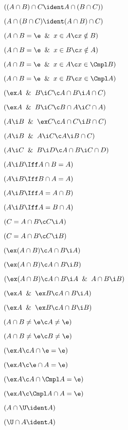  $((A \cap B) \cap C \ident A \cap (B\cap C))$

 $(A\cap (B \cap C) \ident (A \cap B) \cap C)$

 $(A \cap B = \e \And x \in A \c x \notin B)$

 $(A \cap B = \e \And x \in B \c x \notin A)$

 $(A \cap B = \e \And x \in A \c x \in \Cmpl B)$

 $(A \cap B = \e \And x \in B \c x \in \Cmpl A)$

 $(\ex A \And B \i C \c A \cap B\i A\cap  C)$

 $(\ex A \And B \i C \c B \cap A\i C\cap  A)$

 $(A\i B \And \ex C\c A\cap C \i B\cap C)$

 $(A \i B \And A \i C \c A \i B \cap C)$

 $(A \i C \And B \i D \c A \cap B \i C \cap D)$

 $(A\i B \Iff A\cap B = A)$

 $(A\i B \Iff B\cap A = A)$

 $(A\i B \Iff A = A\cap B )$

 $(A\i B \Iff A = B\cap A )$

 $(C = A \cap B \c  C \i A)$

 $(C = A \cap B \c  C \i B)$

 $(\ex(A\cap B) \c A\cap B \i A)$

 $(\ex(A\cap B) \c A\cap B\i B)$

 $(\ex(A\cap B) \c A\cap B\i A \And A \cap B \i B)$

 $(\ex A \And \ex B \c A\cap B \i A)$

 $(\ex A\And \ex B \c A\cap B\i B)$

 $(A\cap B \ne \e \c A \ne \e)$

 $(A \cap B \ne \e \c B \ne \e)$

 $(\ex A \c A\cap \e = \e)$

 $(\ex A \c \e\cap A = \e)$

 $(\ex A \c A \cap \Cmpl A = \e)$

 $(\ex A \c \Cmpl A \cap A = \e)$

 $(A \cap \U \ident A)$

 $(\U \cap A \ident A)$

